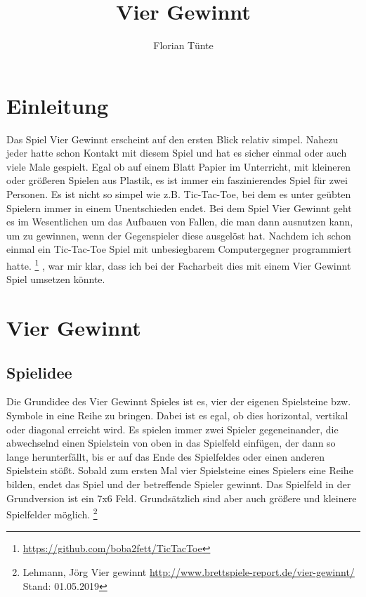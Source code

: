 \documentclass[12pt,a4paper]{article}
\title{Vier Gewinnt}
\author{Florian Tünte}
\begin{document}
	\maketitle
	\newpage
	\tableofcontents
	\newpage
	\section{Einleitung}
	Das Spiel \glqq Vier Gewinnt\grqq{} erscheint auf den ersten Blick relativ simpel. Nahezu jeder hatte schon Kontakt mit diesem Spiel und hat es sicher einmal oder auch viele Male gespielt. Egal ob auf einem Blatt Papier im Unterricht, mit kleineren oder größeren Spielen aus Plastik, es ist immer ein faszinierendes Spiel für zwei Personen. Es ist nicht so simpel wie z.B. Tic-Tac-Toe, bei dem es unter geübten Spielern immer in einem Unentschieden endet. Bei dem Spiel \glqq Vier Gewinnt\grqq{} geht es im Wesentlichen um das Aufbauen von Fallen, die man dann ausnutzen kann, um zu gewinnen, wenn der Gegenspieler diese ausgelöst hat. Nachdem ich schon einmal ein \glqq Tic-Tac-Toe\grqq{} Spiel mit unbesiegbarem Computergegner programmiert hatte.
	\footnote{\url{https://github.com/boba2fett/TicTacToe}}
	, war mir klar, dass ich bei der Facharbeit dies mit einem  \glqq Vier Gewinnt\grqq{} Spiel umsetzen könnte.
	\section{Vier Gewinnt}
	\subsection{Spielidee}
	Die Grundidee des \glqq Vier Gewinnt\grqq{} Spieles ist es, vier der eigenen Spielsteine bzw. Symbole in eine Reihe zu bringen.
	Dabei ist es egal, ob dies horizontal, vertikal oder diagonal erreicht wird.
	Es spielen immer zwei Spieler gegeneinander, die abwechselnd einen Spielstein von oben in das Spielfeld einfügen, der dann so lange herunterfällt, bis er auf das Ende des Spielfeldes oder einen anderen Spielstein stößt.
	Sobald zum ersten Mal vier Spielsteine eines Spielers eine Reihe bilden, endet das Spiel und der betreffende Spieler gewinnt.
	Das Spielfeld in der Grundversion ist ein 7x6 Feld. Grundsätzlich sind aber auch größere und kleinere Spielfelder möglich.
	\footnote{Lehmann, Jörg \glqq Vier gewinnt\grqq{} \url{http://www.brettspiele-report.de/vier-gewinnt/} Stand: 01.05.2019}
\end{document}
